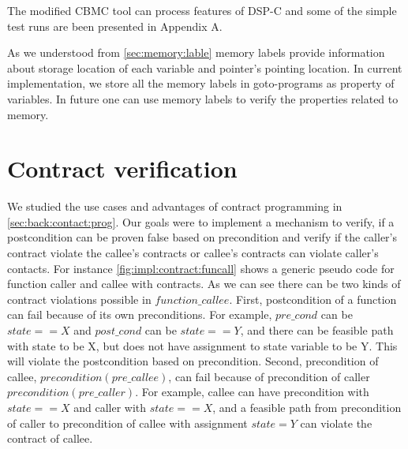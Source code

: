 The modified CBMC tool can process features of DSP-C and some of the simple test runs are been presented in Appendix A.

As we understood from \autoref{sec:memory:lable} memory labels provide information about storage location of each variable and pointer's pointing location. In current implementation, we store all the memory labels in goto-programs as property of variables. In future one can use memory labels to verify the properties related to memory.


\section{Contract verification} \label{impl:contracts}

We studied the use cases and advantages of contract programming in \autoref{sec:back:contact:prog}. Our goals were to implement a mechanism to verify, if a postcondition can be proven false based on precondition and verify if the caller's contract violate the callee's contracts or callee's contracts can violate caller's contacts. For instance \autoref{fig:impl:contract:funcall} shows a generic pseudo code for function caller and callee with contracts. As we can see there can be two kinds of contract violations possible in $function\_callee$. First, postcondition of a function can fail because of its own preconditions. For example, $pre\_cond$ can be $state==X$ and $post\_cond$ can be $state==Y$, and there can be feasible path with state to be X, but does not have assignment to state variable to be Y. This will violate the postcondition based on precondition. Second, precondition of callee, $precondition(pre\_callee)$, can fail because of precondition of caller $precondition(pre\_caller)$.  For example, callee can have precondition with $state==X$ and caller with $state==X$, and a feasible path from precondition of caller to precondition of callee with assignment $state=Y$ can violate the contract of callee.

